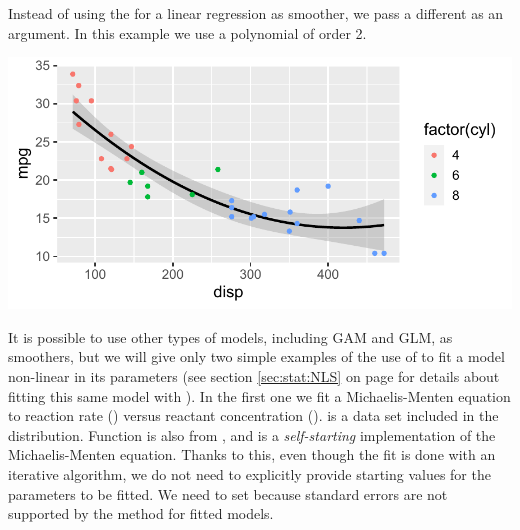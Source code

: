 \documentclass[krantz2]{krantz}\usepackage{knitr}
\begin{document}
Instead of using the  for a linear regression as smoother, we pass a different  as an argument. In this example we use a polynomial of order 2.

\begin{knitrout}\footnotesize
{}\color{fgcolor}\begin{kframe}
\begin{alltt}
\hlstd{(}  \hlstd{(}     \hlstd{=}  \hlopt{+}
  \hlstd{(} \hlstd{=} \hlstd{,}   \hlopt{~}  \hlstd{),}  \hlstd{=} \hlstd{)} \hlopt{+}
  \hlstd{()}
\end{alltt}
\end{kframe}

{\centering \includegraphics[width=.7\textwidth]{figure/pos-smooth-plot-06-1} 

}


\end{knitrout}

It is possible to use other types of models, including GAM and GLM, as smoothers, but we will give only two simple examples of the use of  to fit a model non-linear in its parameters (see section \ref{sec:stat:NLS} on page \pageref{sec:stat:NLS} for details about fitting this same model with ). In the first one we fit a Michaelis-Menten equation to reaction rate () versus reactant concentration ().  is a data set included in the \Rlang distribution. Function  is also from \Rlang, and is a \emph{self-starting} implementation of the Michaelis-Menten equation. Thanks to this, even though the fit is done with an iterative algorithm, we do not need to explicitly provide starting values for the parameters to be fitted. We need to set  because standard errors are not supported by the  method for  fitted models.
\end{document}

